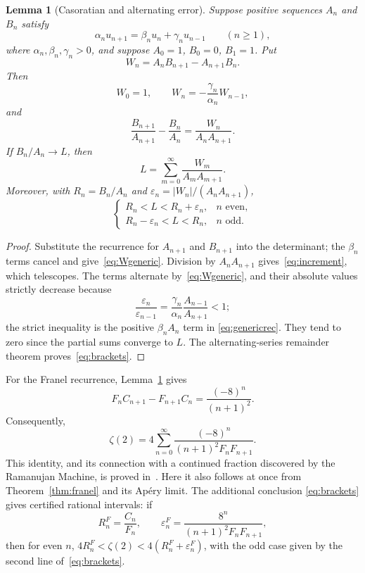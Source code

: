\documentclass[11pt,reqno]{amsart}
\newtheorem{lemma}[theorem]{Lemma}
\theoremstyle{definition}
\theoremstyle{remark}
\begin{document}
\begin{lemma}[Casoratian and alternating error]\label{lem:cas}
Suppose positive sequences $A_n$ and $B_n$ satisfy
\begin{equation}\label{eq:genericrec}
 \alpha_nu_{n+1}=\beta_nu_n+\gamma_nu_{n-1}\qquad(n\geq1),
\end{equation}
where $\alpha_n,\beta_n,\gamma_n>0$, and suppose
$A_0=1$, $B_0=0$, $B_1=1$.  Put
\[
 W_n=A_nB_{n+1}-A_{n+1}B_n.
\]
Then
\begin{equation}\label{eq:Wgeneric}
 W_0=1,\qquad W_n=-\frac{\gamma_n}{\alpha_n}W_{n-1},
\end{equation}
and
\begin{equation}\label{eq:increment}
 \frac{B_{n+1}}{A_{n+1}}-\frac{B_n}{A_n}
 =\frac{W_n}{A_nA_{n+1}}.
\end{equation}
If $B_n/A_n\to L$, then
\begin{equation}\label{eq:casSeries}
 L=\sum_{m=0}^{\infty}\frac{W_m}{A_mA_{m+1}}.
\end{equation}
Moreover, with $R_n=B_n/A_n$ and
$\varepsilon_n=|W_n|/(A_nA_{n+1})$,
\begin{equation}\label{eq:brackets}
 \begin{cases}
  R_n<L<R_n+\varepsilon_n,&n\text{ even},\\
  R_n-\varepsilon_n<L<R_n,&n\text{ odd}.
 \end{cases}
\end{equation}
\end{lemma}

\begin{proof}
Substitute the recurrence for $A_{n+1}$ and $B_{n+1}$ into the determinant;
the $\beta_n$ terms cancel and give~\eqref{eq:Wgeneric}.  Division by
$A_nA_{n+1}$ gives~\eqref{eq:increment}, which telescopes.  The terms alternate
by~\eqref{eq:Wgeneric}, and their absolute values strictly decrease because
\[
 \frac{\varepsilon_n}{\varepsilon_{n-1}}
 =\frac{\gamma_n}{\alpha_n}\frac{A_{n-1}}{A_{n+1}}<1;
\]
the strict inequality is the positive $\beta_nA_n$ term in
\eqref{eq:genericrec}.  They tend to zero since the partial sums converge to
$L$.  The alternating-series remainder theorem proves~\eqref{eq:brackets}.
\end{proof}

For the Franel recurrence, Lemma~\ref{lem:cas} gives
\begin{equation}\label{eq:WF}
 F_nC_{n+1}-F_{n+1}C_n=\frac{(-8)^n}{(n+1)^2}.
\end{equation}
Consequently,
\begin{equation}\label{eq:Fseries}
 \boxed{\displaystyle
 \zeta(2)=4\sum_{n=0}^{\infty}
 \frac{(-8)^n}{(n+1)^2F_nF_{n+1}}.}
\end{equation}
This identity, and its connection with a continued fraction discovered by the
Ramanujan Machine, is proved in~\cite{FranelCF}.  Here it also follows at once
from Theorem~\ref{thm:franel} and its Ap\'ery limit.  The additional conclusion
\eqref{eq:brackets} gives certified rational intervals: if
\[
 R_n^{F}=\frac{C_n}{F_n},\qquad
 \varepsilon_n^{F}=\frac{8^n}{(n+1)^2F_nF_{n+1}},
\]
then for even $n$,
$4R_n^F<\zeta(2)<4(R_n^F+\varepsilon_n^F)$, with the odd case given by
the second line of~\eqref{eq:brackets}.
\end{document}
